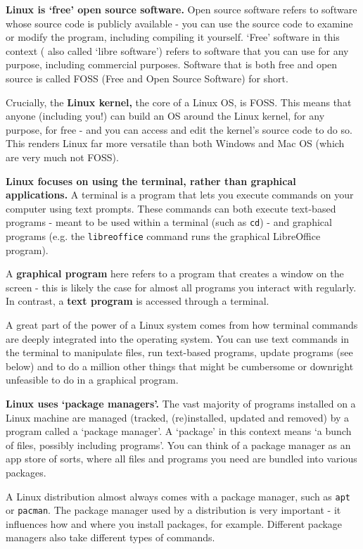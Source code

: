 \documentclass[12pt]{article}
\begin{document}
\textbf{Linux is `free' open source software.} Open source software refers to software whose source code is publicly available - you can use the source code to examine or modify the program, including compiling it yourself. `Free' software in this context ( also called `libre software') refers to software that you can use for any purpose, including commercial purposes. Software that is both free and open source is called FOSS (Free and Open Source Software) for short. 

Crucially, the \textbf{Linux kernel,} the core of a Linux OS, is FOSS. This means that anyone (including you!) can build an OS around the Linux kernel, for any purpose, for free - and you can access and edit the kernel's source code to do so. This renders Linux far more versatile than both Windows and Mac OS (which are very much not FOSS). 

\textbf{Linux focuses on using the terminal, rather than graphical applications.} A terminal is a program that lets you execute commands on your computer using text prompts. These commands can both execute text-based programs - meant to be used within a terminal (such as \verb|cd|) - and graphical programs (e.g. the \verb|libreoffice| command runs the graphical LibreOffice program). 

A \textbf{graphical program} here refers to a program that creates a window on the screen - this is likely the case for almost all programs you interact with regularly. In contrast, a \textbf{text program} is accessed through a terminal. 

A great part of the power of a Linux system comes from how terminal commands are deeply integrated into the operating system. You can use text commands in the terminal to manipulate files, run text-based programs, update programs (see below) and to do a million other things that might be cumbersome or downright unfeasible to do in a graphical program.

\textbf{Linux uses `package managers'.} The vast majority of programs installed on a Linux machine are managed (tracked, (re)installed, updated and removed) by a program called a `package manager'. A `package' in this context means `a bunch of files, possibly including programs'. You can think of a package manager as an app store of sorts, where all files and programs you need are bundled into various packages. 

A Linux distribution almost always comes with a package manager, such as \verb|apt| or \verb|pacman|. The package manager used by a distribution is very important - it influences how and where you install packages, for example. Different package managers also take different types of commands.
\end{document}
